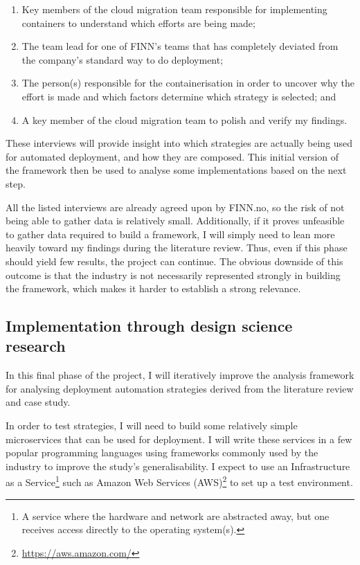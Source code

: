 \begin{enumerate}
  \item Key members of the cloud migration team responsible for implementing containers to understand which efforts are being made;
  \item The team lead for one of FINN's teams that has completely deviated from the company's standard way to do deployment;
  \item The person(s) responsible for the containerisation in order to uncover why the effort is made and which factors determine which strategy is selected; and
  \item A key member of the cloud migration team to polish and verify my findings.
\end{enumerate}

These interviews will provide insight into which strategies are actually being used for automated deployment, and how they are composed. This initial version of the framework then be used to analyse some implementations based on the next step.

All the listed interviews are already agreed upon by FINN.no, so the risk of not being able to gather data is relatively small. Additionally, if it proves unfeasible to gather data required to build a framework, I will simply need to lean more heavily toward my findings during the literature review. Thus, even if this phase should yield few results, the project can continue. The obvious downside of this outcome is that the industry is not necessarily represented strongly in building the framework, which makes it harder to establish a strong relevance.

\subsection{Implementation through design science research}

In this final phase of the project, I will iteratively improve the analysis framework for analysing deployment automation strategies derived from the literature review and case study.

In order to test strategies, I will need to build some relatively simple microservices that can be used for deployment. I will write these services in a few popular programming languages using frameworks commonly used by the industry to improve the study's generalisability. I expect to use an Infrastructure as a Service\footnote{A service where the hardware and network are abstracted away, but one receives access directly to the operating system(s).} such as Amazon Web Services (AWS)\footnote{\url{https://aws.amazon.com/}} to set up a test environment.

